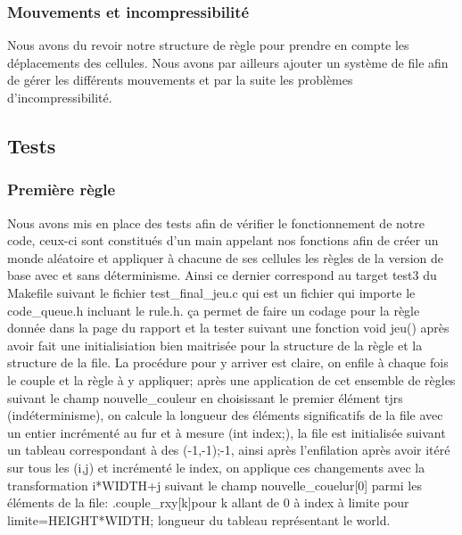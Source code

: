\documentclass{article}
\begin{document}
{{        
        \subsubsection{Mouvements et incompressibilité}
            {
            Nous avons du revoir notre structure de règle pour prendre en compte les déplacements des cellules. Nous avons par ailleurs ajouter un système de file afin de gérer les différents mouvements et par la suite les problèmes d'incompressibilité.
            
            }
    
        }
    
    
    
    
    \subsection{Tests}
        {
        \subsubsection{Première règle}
            {
            Nous avons mis en place des tests afin de vérifier le fonctionnement de notre code, ceux-ci sont constitués d'un main appelant nos fonctions afin de créer un monde aléatoire et appliquer à chacune de ses cellules les règles de la version de base avec et sans déterminisme. Ainsi ce dernier correspond au target test3 du Makefile suivant le fichier test\_final\_jeu.c qui est un fichier qui importe le code\_queue.h incluant le rule.h. ça permet de faire un codage pour la règle donnée dans la page du rapport et la tester suivant une fonction void jeu() après avoir fait une initialisiation bien maitrisée pour la structure de la règle et la structure de la file. La procédure pour y arriver est claire, on enfile à chaque fois le couple et la règle à y appliquer; après une application de cet ensemble de règles suivant le champ nouvelle\_couleur en choisissant le premier élément tjrs (indéterminisme), on calcule la longueur des éléments significatifs de la file avec un entier incrémenté au fur et à mesure (int index;), la file est initialisée suivant un tableau correspondant à des (-1,-1);-1, ainsi après l'enfilation après avoir itéré sur tous les (i,j) et incrémenté le index, on applique ces changements avec la transformation i*WIDTH+j suivant le champ nouvelle\_couelur[0] parmi les éléments de la file: .couple\_rxy[k]pour k allant de 0 à index à limite pour limite=HEIGHT*WIDTH; longueur du tableau représentant le world.
            
}}}
\end{document}
